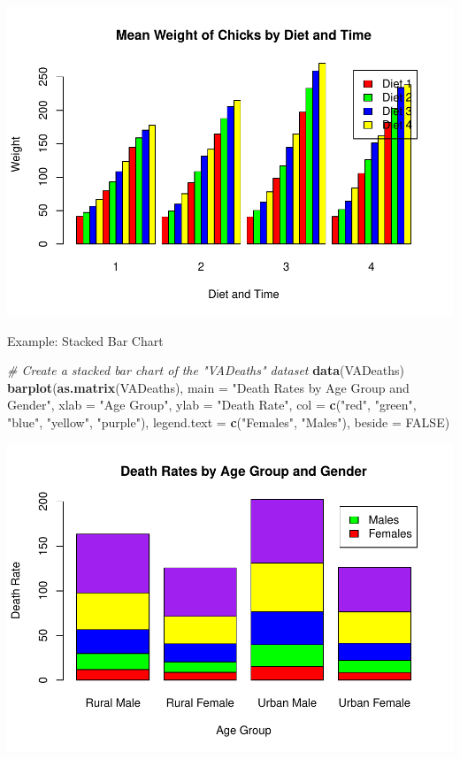 \documentclass[
]{book}
\newenvironment{Shaded}{\begin{snugshade}}{\end{snugshade}}
\newcommand{\AttributeTok}[1]{\textcolor[rgb]{0.13,0.29,0.53}{#1}}
\newcommand{\CommentTok}[1]{\textcolor[rgb]{0.56,0.35,0.01}{\textit{#1}}}
\newcommand{\ConstantTok}[1]{\textcolor[rgb]{0.56,0.35,0.01}{#1}}
\newcommand{\FunctionTok}[1]{\textcolor[rgb]{0.13,0.29,0.53}{\textbf{#1}}}
\newcommand{\NormalTok}[1]{#1}
\newcommand{\StringTok}[1]{\textcolor[rgb]{0.31,0.60,0.02}{#1}}
\begin{document}
\begin{center}\includegraphics[height=0.55\textheight]{DauR_files/figure-latex/p8-1} \end{center}

Example: Stacked Bar Chart

\begin{Shaded}
\begin{Highlighting}[]
\CommentTok{\# Create a stacked bar chart of the "VADeaths" dataset}
\FunctionTok{data}\NormalTok{(VADeaths)}
\FunctionTok{barplot}\NormalTok{(}\FunctionTok{as.matrix}\NormalTok{(VADeaths), }
        \AttributeTok{main =} \StringTok{"Death Rates by Age Group and Gender"}\NormalTok{, }
        \AttributeTok{xlab =} \StringTok{"Age Group"}\NormalTok{, }
        \AttributeTok{ylab =} \StringTok{"Death Rate"}\NormalTok{, }
        \AttributeTok{col =} \FunctionTok{c}\NormalTok{(}\StringTok{"red"}\NormalTok{, }\StringTok{"green"}\NormalTok{, }\StringTok{"blue"}\NormalTok{, }\StringTok{"yellow"}\NormalTok{, }\StringTok{"purple"}\NormalTok{), }
        \AttributeTok{legend.text =} \FunctionTok{c}\NormalTok{(}\StringTok{"Females"}\NormalTok{, }\StringTok{"Males"}\NormalTok{), }
        \AttributeTok{beside =} \ConstantTok{FALSE}\NormalTok{)}
\end{Highlighting}
\end{Shaded}

\begin{center}\includegraphics[height=0.55\textheight]{DauR_files/figure-latex/p9-1} \end{center}
\end{document}
